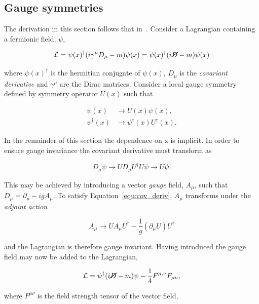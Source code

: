 \subsection{Gauge symmetries}

The derivation in this section follows that in~\cite{ewk-int}. Consider a Lagrangian containing a fermionic field, $\psi$,

\begin{equation}
\mathcal{L} = \psi(x)^{\dagger} (i\gamma^{\mu}D_{\mu} - m)\psi(x) = \psi(x)^{\dagger} (i\cancel{D} - m)\psi(x)
\end{equation}

where $\psi(x)^{\dagger}$ is the hermitian conjugate of $\psi(x)$, $D_{\mu}$ is the \emph{covariant derivative} and
$\gamma^{\mu}$ are the Dirac matrices. Consider a local gauge symmetry defined by symmetry operator $U(x)$ such that

\begin{align}
\psi(x) &\rightarrow U(x)\psi(x), \\
\psi^{\dagger}(x) &\rightarrow \psi^{\dagger} (x) U^{\dagger} (x).
\end{align}

In the remainder of this section the dependence on x is implicit. In order to ensure gauge invariance the 
covariant derivative must transform as 

\begin{equation}
\label{equ:cov_deriv}
D_{\mu}\psi \rightarrow U D_{\mu}U^{\dagger} U \psi \rightarrow U \psi.
\end{equation}

This may be achieved by introducing a vector \emph{gauge} field, $A_\mu$, such that 
$D_{\mu} = \partial_{\mu} - igA_{\mu}$. To satisfy Equation~\ref{equ:cov_deriv},
$A_{\mu}$ transforms under the \emph{adjoint action}

\begin{equation}
A_{\mu} \rightarrow U A_{\mu} U^{\dagger} - \frac{1}{g}(\partial_{\mu}U)U^{\dagger}
\end{equation}

and the Lagrangian is therefore gauge invariant. Having introduced the gauge field may now be added to the Lagrangian,

\begin{equation}
\mathcal{L} = \psi^{\dagger} (i\cancel{D} - m)\psi - \frac{1}{4}F^{\mu,\nu}F_{\mu\nu},
\end{equation}

where $F^{\mu\nu}$ is the field strength tensor of the vector field,

